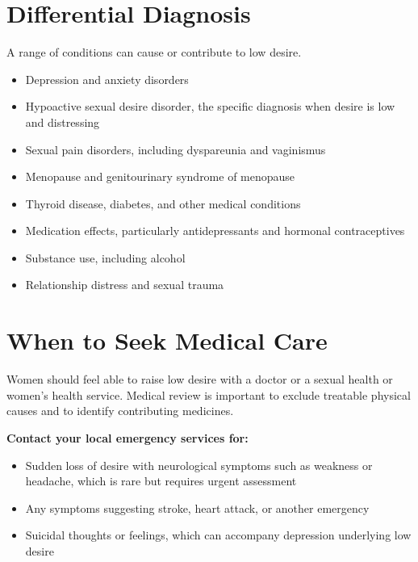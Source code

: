 \section*{Differential Diagnosis}
A range of conditions can cause or contribute to low desire.
\begin{itemize}
    \item Depression and anxiety disorders
    \item Hypoactive sexual desire disorder, the specific diagnosis when desire is low and distressing
    \item Sexual pain disorders, including dyspareunia and vaginismus
    \item Menopause and genitourinary syndrome of menopause
    \item Thyroid disease, diabetes, and other medical conditions
    \item Medication effects, particularly antidepressants and hormonal contraceptives
    \item Substance use, including alcohol
    \item Relationship distress and sexual trauma
\end{itemize}

\section*{When to Seek Medical Care}
Women should feel able to raise low desire with a doctor or a sexual health or women's health service. Medical review is important to exclude treatable physical causes and to identify contributing medicines.

\textbf{Contact your local emergency services for:}
\begin{itemize}
    \item Sudden loss of desire with neurological symptoms such as weakness or headache, which is rare but requires urgent assessment
    \item Any symptoms suggesting stroke, heart attack, or another emergency
    \item Suicidal thoughts or feelings, which can accompany depression underlying low desire
\end{itemize}

